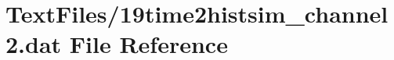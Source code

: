 \hypertarget{19time2histsim__channel2_8dat}{}\section{Text\+Files/19time2histsim\+\_\+channel2.dat File Reference}
\label{19time2histsim__channel2_8dat}
